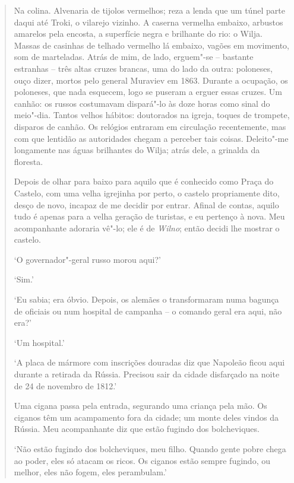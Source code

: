 \begin{quote}
Na colina. Alvenaria de tijolos vermelhos; reza a lenda que um túnel
parte daqui até Troki, o vilarejo vizinho. A caserna vermelha embaixo,
arbustos amarelos pela encosta, a superfície negra e brilhante do rio: o
Wilja. Massas de casinhas de telhado vermelho lá embaixo, vagões em
movimento, som de marteladas. Atrás de mim, de lado, erguem"-se --
bastante estranhas -- três altas cruzes brancas, uma do lado da outra:
poloneses, ouço dizer, mortos pelo general Muraviev em 1863. Durante a
ocupação, os poloneses, que nada esquecem, logo se puseram a erguer
essas cruzes. Um canhão: os russos costumavam dispará"-lo às doze horas
como sinal do meio"-dia. Tantos velhos hábitos: doutorados na igreja,
toques de trompete, disparos de canhão. Os relógios entraram em
circulação recentemente, mas com que lentidão as autoridades chegam a
perceber tais coisas. Deleito"-me longamente nas águas brilhantes do
Wilja; atrás dele, a grinalda da floresta.

Depois de olhar para baixo para aquilo que é conhecido como Praça do
Castelo, com uma velha igrejinha por perto, o castelo propriamente dito,
desço de novo, incapaz de me decidir por entrar. Afinal de contas,
aquilo tudo é apenas para a velha geração de turistas, e eu pertenço à
nova. Meu acompanhante adoraria vê"-lo; ele é de \textit{Wilno}; então decidi lhe
mostrar o castelo.

`O governador"-geral russo morou aqui?'

`Sim.'

`Eu sabia; era óbvio. Depois, os alemães o transformaram numa bagunça de
oficiais ou num hospital de campanha -- o comando geral era aqui, não
era?'

`Um hospital.'

`A placa de mármore com inscrições douradas diz que Napoleão ficou aqui
durante a retirada da Rússia. Precisou sair da cidade disfarçado na
noite de 24 de novembro de 1812.'

Uma cigana passa pela entrada, segurando uma criança pela mão. Os
ciganos têm um acampamento fora da cidade; um monte deles vindos da
Rússia. Meu acompanhante diz que estão fugindo dos bolcheviques.

`Não estão fugindo dos bolcheviques, meu filho. Quando gente pobre chega
ao poder, eles só atacam os ricos. Os ciganos estão sempre fugindo, ou
melhor, eles não fogem, eles perambulam.'


\end{quote}
